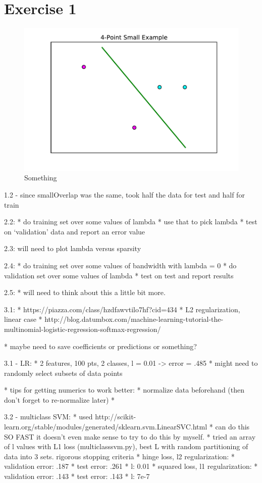 \documentclass[10pt]{article}
\begin{document}
\section{Exercise 1}

\begin{figure}[!ht]
	\centering
	\includegraphics[width=\textwidth]{exercise1-1.pdf}
	\caption{Something}
	\label{fig:1-1}
\end{figure}


1.2 - since smallOverlap was the same, took half the data for test and half for train



2.2: 
* do training set over some values of lambda
* use that to pick lambda
* test on `validation' data and report an error value

2.3:
will need to plot lambda versus sparsity

2.4:
* do training set over some values of bandwidth with lambda = 0
* do validation set over some values of lambda
* test on test and report results

2.5:
* will need to think about this a little bit more.

3.1:
* https://piazza.com/class/hzdfawvtilo7hf?cid=434
* L2 regularization, linear case
* http://blog.datumbox.com/machine-learning-tutorial-the-multinomial-logistic-regression-softmax-regression/

* maybe need to save coefficients or predictions or something?

3.1 - LR:
* 2 features, 100 pts, 2 classes, l = 0.01 -> error = .485
* might need to randomly select subsets of data points

* tips for getting numerics to work better:
	* normalize data beforehand (then don't forget to re-normalize later)
	* 

3.2 - multiclass SVM:
* used http://scikit-learn.org/stable/modules/generated/sklearn.svm.LinearSVC.html
* can do this SO FAST it doesn't even make sense to try to do this by myself.
* tried an array of l values with L1 loss (multiclasssvm.py), best L with random partitioning of data into 3 sets. rigorous stopping criteria
* hinge loss, l2 regularization: 
	* validation error: .187
	* test error: .261
	* l: 0.01
* squared loss, l1 regularization:
	* validation error: .143
	* test error: .143
	* l: 7e-7
\end{document}
